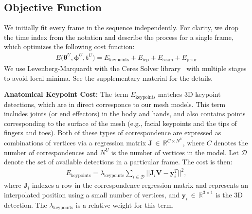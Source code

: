 
\subsection{Objective Function}

We initially fit every frame in the sequence independently. For clarity, we drop the time index from the notation and describe the process for a single frame, which optimizes the following cost function:
\begin{align}
\label{eq:fitting_franken}
E\big( \boldsymbol{\theta}^U, \boldsymbol{\phi}^U, \boldsymbol{t}^U \big) = E_\textrm{keypoints} + E_\textrm{icp} + E_\textrm{seam} +E_\textrm{prior}
\end{align}
We use Levenberg-Marquardt with the Ceres Solver library~\cite{ceres-solver} with multiple stages to avoid local minima. See the supplementary material for the details.

\textbf{Anatomical Keypoint Cost:} The term $E_\textrm{keypoints}$ matches 3D keypoint detections, which are in direct corresponce to our mesh models. This term includes joints (or end effectors) in the body and hands, and also contains points corresponding to the surface of the mesh (e.g., facial keypoints and the tips of fingers and toes). Both of these types of correspondence are expressed as combinations of vertices via a regression matrix $\mathbf{J}\,{\in}\,\mathds{R}^{C\times N^U}$, where $C$ denotes the number of correspondences and $N^U$ is the number of vertices in the model. Let $\mathcal{D}$ denote the set of available detections in a particular frame. The cost is then:
\begin{align}
E_\textrm{keypoints} = \lambda_\textrm{keypoints} \sum_{i\in\mathcal{D}}|| \mathbf{J}_i \mathbf{V} - \mathbf{y}_i^T ||^2,
\label{eq:detection_eq}
\end{align}
where $\mathbf{J}_i$ indexes a row in the correspondence regression matrix and represents an interpolated position using a small number of vertices, and $\mathbf{y}_i\,{\in}\,\mathds{R}^{3 \times 1}$ is the 3D detection. The $\lambda_\textrm{keypoints}$ is a relative weight for this term.

